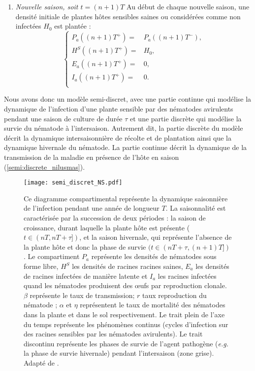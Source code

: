 \begin{enumerate}
\item  \emph{Nouvelle saison, soit $t=(n+1)T$}\quad
Au début de chaque nouvelle saison, une densité initiale de plantes hôtes sensibles saines ou considérées comme non infectées $H_0$ est plantée :   
\begin{equation}
	\left\{
		\begin{aligned}
		P_a ((n+1)T^+)=& P_a((n+1)T^-),\\
		H^S ((n+1)T^+)=& H_0,\\
		E_a ((n+1)T^+)=& 0,\\
		I_a ((n+1)T^+)=& 0.\\
		\end{aligned}
	\right.																				
	\label{sys} 
\end{equation}	
\end{enumerate}
	
	Nous avons donc un modèle semi-discret, avec une partie continue qui modélise la dynamique de
l’infection d’une plante sensible par des nématodes avirulents pendant une saison de culture de durée $\tau$ et une partie discrète qui modélise la survie du nématode à l'intersaison. Autrement dit,  la partie discrète du modèle décrit la dynamique intersaisonnière de récolte et de plantation ainsi que la dynamique hivernale du nématode. La partie continue décrit la dynamique de la transmission de la maladie en présence de l'hôte en saison (\autoref{semi:discrete_nilusmas}).
	
\begin{figure}[H]
	\centering \texttt{[image: semi\_discret\_NS.pdf]}
		\caption[Diagramme compartimental de  la dynamique saisonnière de l'infection d'une plante sensible par des   
		nématodes avirulents.]{
		Ce diagramme compartimental  représente la dynamique saisonnière de l'infection pendant une année de longueur  
		$T$. La saisonnalité est caractérisée par  la succession de deux périodes : la saison de croissance, durant 
		laquelle la plante hôte est présente ($t \in (nT, nT + \tau])$, et la saison hivernale, qui représente 
		l'absence de la plante hôte et donc la phase de survie $(t \in (nT + \tau, (n + 1)T])$. Le compartiment $P_a$ 
		représente les densités de nématodes sous forme libre, $H^S$ les densités de racines racines  saines, $E_a$ 
		les densités de racines infectées de manière latente et $I_a$ les racines infectées quand les nématodes 
		produisent des œufs par reproduction clonale.  $\beta$ représente le taux de transmission; $r $ taux   
		reproduction du nématode ;  $\alpha$ et $\eta$ représentent le taux
		de mortalité des nématodes dans la plante et dans le sol respectivement.  
		Le trait plein de l’axe du temps représente les phénomènes continus (cycles d’infection sur des racines    
		sensibles par les nématodes avirulents). Le trait discontinu représente les phases de survie de l'agent 
		pathogène  (\textit{e.g.} la phase de survie hivernale) pendant l’intersaison (zone grise). Adapté de 
		\citet{Mailleret2012}.}
	\label{semi:discrete_nilusmas}
\end{figure}
	
